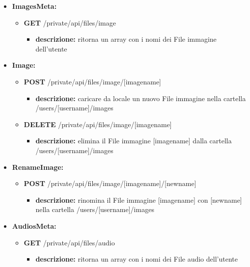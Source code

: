 {{\begin{itemize}
		\item \textbf{ImagesMeta:}
			\begin{itemize}
			\item   \textbf{GET} /private/api/files/image 
				\begin{itemize} 
				\item \textbf{descrizione:} ritorna un array con i nomi dei File immagine dell'utente
				\end{itemize}
			\end{itemize}
			
		\item \textbf{Image:}
			\begin{itemize}
			\item    \textbf{POST} /private/api/files/image/[imagename]
				\begin{itemize} 
				\item \textbf{descrizione:} caricare da locale un nuovo File immagine nella cartella /users/[username]/images					
				\end{itemize}
			\item   \textbf{DELETE} /private/api/files/image/[imagename]
				\begin{itemize} 
				\item \textbf{descrizione:} elimina il File immagine [imagename] dalla cartella /users/[username]/images			
				\end{itemize}
			\end{itemize}
			
		\item \textbf{RenameImage:}
			\begin{itemize}
			\item   \textbf{POST} /private/api/files/image/[imagename]/[newname] 
				\begin{itemize} 
				\item \textbf{descrizione:} rinomina il File immagine [imagename] con [newname] nella cartella /users/[username]/images
				\end{itemize}
			\end{itemize}
			
		\item \textbf{AudiosMeta:}
			\begin{itemize}
			\item   \textbf{GET} /private/api/files/audio
				\begin{itemize} 
				\item \textbf{descrizione:} ritorna un array con i nomi dei File audio dell'utente
				\end{itemize}
			\end{itemize}
			

\end{itemize}}}
